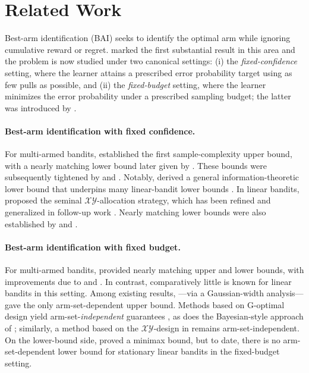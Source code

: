 \section{Related Work} \label{sec:related_work}
Best-arm identification (BAI) seeks to identify the optimal arm while ignoring cumulative reward or regret.  \citet{goos_pac_2002} marked the first substantial result in this area and the problem is now studied under two canonical settings: (i) the \emph{fixed-confidence} setting, where the learner attains a prescribed error probability target using as few pulls as possible, and (ii) the \emph{fixed-budget} setting, where the learner minimizes the error probability under a prescribed sampling budget; the latter was introduced by \citet{bubeck2009pure}.

\paragraph{Best-arm identification with fixed confidence.}
For multi-armed bandits, \citet{goos_pac_2002} established the first sample-complexity upper bound, with a nearly matching lower bound later given by \citet{mannor2004sample}. These bounds were subsequently tightened by \citet{karnin_almost_2013} and \citet{kaufmann2016complexity}. Notably, \citet{kaufmann2016complexity} derived a general information-theoretic lower bound that underpins many linear-bandit lower bounds \citep{NEURIPS2019_8ba6c657, NEURIPS2020_7212a656, camilleri2021selective}. In linear bandits, \citet{soare2014best} proposed the seminal $\mathcal{XY}$-allocation strategy, which has been refined and generalized in follow-up work \citep{tao2018best, xu2018fully, degenne_gamification_2020, NEURIPS2019_8ba6c657, NEURIPS2020_7212a656, NEURIPS2020_75800f73}. Nearly matching lower bounds were also established by \citet{NEURIPS2019_8ba6c657} and \citet{NEURIPS2020_7212a656}.

\paragraph{Best-arm identification with fixed budget.}
For multi-armed bandits, \citet{audibert2010best} provided nearly matching upper and lower bounds, with improvements due to \citet{karnin_almost_2013} and \citet{kaufmann2016complexity}. In contrast, comparatively little is known for linear bandits in this setting. Among existing results, \citet{NEURIPS2020_75800f73}—via a Gaussian-width analysis—gave the only arm-set-dependent upper bound. Methods based on G-optimal design yield arm-set-\emph{independent} guarantees \citep{ijcai2022p388, NEURIPS2022_4f9342b7}, as does the Bayesian-style approach of \citet{hoffman2014correlation}; similarly, a method based on the $\mathcal{XY}$-design in \citet{alieva_robust_2021} remains arm-set-independent. On the lower-bound side, \citet{NEURIPS2022_4f9342b7} proved a minimax bound, but to date, there is no arm-set-dependent lower bound for stationary linear bandits in the fixed-budget setting.

